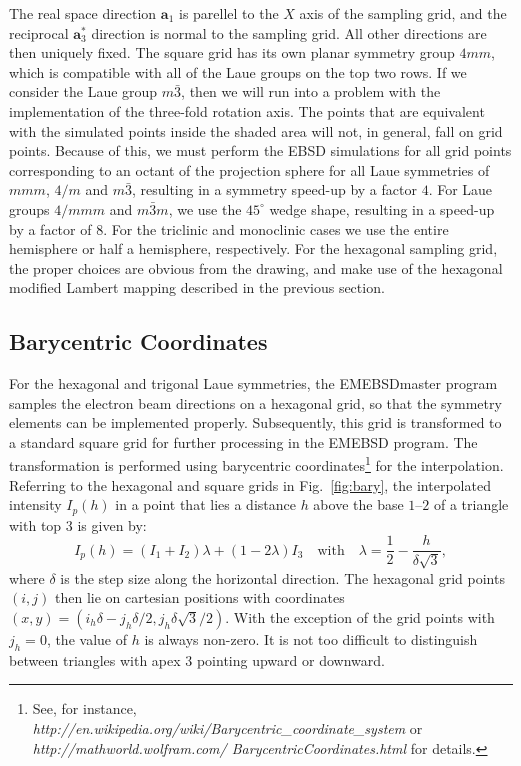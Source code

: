 \documentclass[DIV=calc, paper=letter, fontsize=11pt]{scrartcl}	 %
\begin{document}
The real space direction $\mathbf{a}_1$ is parellel to the $X$ axis of the sampling grid, and the reciprocal $\mathbf{a}_3^{\ast}$ direction
is normal to the sampling grid.  All other directions are then uniquely fixed.  The square grid has its own planar symmetry group $4mm$,
which is compatible with all of the Laue groups on the top two rows.  If we consider the Laue group $m\bar{3}$, then 
we will run into a problem with the implementation of the three-fold rotation axis.  The points that are equivalent with the simulated points
inside the shaded area will not, in general, fall on grid points.  Because of this, we must perform the EBSD simulations for all grid points
corresponding to an octant of the projection sphere for all Laue symmetries of $mmm$, $4/m$ and $m\bar{3}$, resulting in a symmetry speed-up by a factor $4$.  For Laue groups 
$4/mmm$ and $m\bar{3}m$, we use the $45^{\circ}$ wedge shape, resulting in a speed-up by a factor of $8$.  For the triclinic and monoclinic cases we use the entire hemisphere
or half a hemisphere, respectively.
For the hexagonal sampling grid, the proper choices are obvious from the drawing, and make use of the hexagonal modified Lambert mapping described
in the previous section.

\subsection{Barycentric Coordinates \label{sec:barycentric}}
For the hexagonal and trigonal Laue symmetries, the \textsf{EMEBSDmaster} program samples the electron beam directions on 
a hexagonal grid, so that the symmetry elements can be implemented properly.  Subsequently, this grid is transformed to a standard
square grid for further processing in the \textsf{EMEBSD} program.  The transformation is performed using barycentric coordinates\footnote{See, for
instance, \textit{http://en.wikipedia.org/wiki/Barycentric\_coordinate\_system} or \textit{http://mathworld.wolfram.com/ BarycentricCoordinates.html} for details.}
for the interpolation.  Referring to the hexagonal and square grids in Fig.~\ref{fig:bary}, 
the interpolated intensity $I_p(h)$ in a point that lies a 
distance $h$ above the base $1$--$2$ of a triangle with top $3$ is given by:
\[
	I_p(h) = (I_1+I_2)\lambda+(1-2\lambda) I_3\quad\text{with}\quad \lambda=\frac{1}{2} - \frac{h}{\delta\sqrt{3}},
\]
where $\delta$ is the step size along the horizontal direction.  The hexagonal grid points $(i,j)$ then 
lie on cartesian positions with coordinates $(x,y)=(i_h\delta-j_h\delta/2,j_h\delta\sqrt{3}/2)$.  With the exception of 
the grid points with $j_h=0$, the value of $h$ is always non-zero.  It is not too difficult to distinguish between
triangles with apex $3$ pointing upward or downward.
\end{document}
